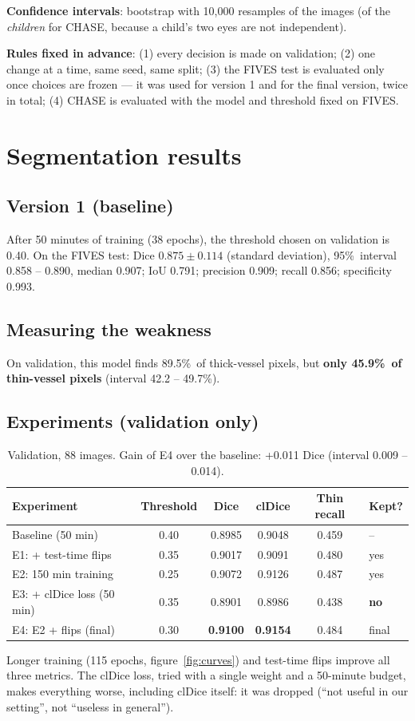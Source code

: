 \documentclass[11pt,a4paper]{article}
\newcommand{\pct}{\%}
\begin{document}
\textbf{Confidence intervals}: bootstrap with 10{,}000 resamples of the images (of the \emph{children} for CHASE, because a child's two eyes are not independent).

\textbf{Rules fixed in advance}: (1) every decision is made on validation; (2) one change at a time, same seed, same split; (3) the FIVES test is evaluated only once choices are frozen --- it was used for version 1 and for the final version, twice in total; (4) CHASE is evaluated with the model and threshold fixed on FIVES.

\section{Segmentation results}

\subsection{Version 1 (baseline)}
After 50 minutes of training (38 epochs), the threshold chosen on validation is 0.40. On the FIVES test: Dice $0.875\pm0.114$ (standard deviation), 95\pct\ interval 0.858 -- 0.890, median 0.907; IoU 0.791; precision 0.909; recall 0.856; specificity 0.993.

\subsection{Measuring the weakness}
On validation, this model finds 89.5\pct\ of thick-vessel pixels, but \textbf{only 45.9\pct\ of thin-vessel pixels} (interval 42.2 -- 49.7\pct).

\subsection{Experiments (validation only)}
\begin{table}[h]
\centering\small
\begin{tabular}{@{}lccccl@{}}
\toprule
\textbf{Experiment} & \textbf{Threshold} & \textbf{Dice} & \textbf{clDice} & \textbf{Thin recall} & \textbf{Kept?} \\
\midrule
Baseline (50 min) & 0.40 & 0.8985 & 0.9048 & 0.459 & -- \\
E1: + test-time flips & 0.35 & 0.9017 & 0.9091 & 0.480 & yes \\
E2: 150 min training & 0.25 & 0.9072 & 0.9126 & 0.487 & yes \\
E3: + clDice loss (50 min) & 0.35 & 0.8901 & 0.8986 & 0.438 & \textbf{no} \\
E4: E2 + flips (final) & 0.30 & \textbf{0.9100} & \textbf{0.9154} & 0.484 & final \\
\bottomrule
\end{tabular}
\caption{Validation, 88 images. Gain of E4 over the baseline: +0.011 Dice (interval 0.009 -- 0.014).}
\label{tab:exp}
\end{table}
Longer training (115 epochs, figure~\ref{fig:curves}) and test-time flips improve all three metrics. The clDice loss, tried with a single weight and a 50-minute budget, makes everything worse, including clDice itself: it was dropped (``not useful in our setting'', not ``useless in general'').
\end{document}
